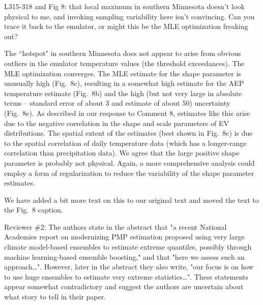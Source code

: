 \documentclass[12pt,english]{reviewresponse}
\begin{document}
\begin{revcomment}
  L315-318 and Fig 8: that local maximum in southern Minnesota doesn't look physical to me, and invoking sampling variability here isn't convincing. Can you trace it back to the emulator, or might this be the MLE optimization freaking out?
  
\end{revcomment}
\begin{revresponse}

The ``hotspot" in southern Minnesota does not appear to arise from obvious outliers in the emulator temperature values (the threshold exceedances). The MLE optimization converges. The MLE estimate for the shape parameter is unusually high (Fig.\ 8c), resulting in a somewhat high estimate for the AEP temperature estimate (Fig.\ 8b) and the high (but not very large in absolute terms -- standard error of about 3 and estimate of about 50) uncertainty (Fig.\ 8e).
As described in our response to Comment 8, estimates like this arise due to the negative correlation in the shape and scale parameters of EV distributions.
The spatial extent of the estimates (best shown in Fig.\ 8c) is due to the spatial correlation of daily temperature data (which has a longer-range correlation than precipitation data).
We agree that the large positive shape parameter is probably not physical.
Again, a more comprehensive analysis could employ a form of regularization to reduce the variability of the shape parameter estimates. 

We have added a bit more text on this to our original text and moved the text to the Fig.\ 8 caption.


\end{revresponse}


\reviewer 
\begin{revcomment}
   Reviewer \#2: The authors state in the abstract that "a recent National Academies report on modernizing PMP estimation proposed using very large climate model-based ensembles to estimate extreme quantiles, possibly through machine learning-based ensemble boosting," and that "here we assess such an approach…". However, later in the abstract they also write, "our focus is on how to use huge ensembles to estimate very extreme statistics…". These statements appear somewhat contradictory and suggest the authors are uncertain about what story to tell in their paper.
 
\end{revcomment}
\end{document}
